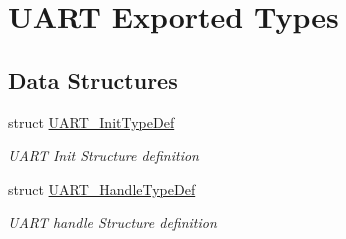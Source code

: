 \hypertarget{group___u_a_r_t___exported___types}{}\section{U\+A\+RT Exported Types}
\label{group___u_a_r_t___exported___types}
\subsection*{Data Structures}
\begin{DoxyCompactItemize}
\item 
struct \mbox{\hyperlink{struct_u_a_r_t___init_type_def}{U\+A\+R\+T\+\_\+\+Init\+Type\+Def}}
\begin{DoxyCompactList}\small\item\em U\+A\+RT Init Structure definition ~\newline
 \end{DoxyCompactList}\item 
struct \mbox{\hyperlink{struct_u_a_r_t___handle_type_def}{U\+A\+R\+T\+\_\+\+Handle\+Type\+Def}}
\begin{DoxyCompactList}\small\item\em U\+A\+RT handle Structure definition ~\newline
 \end{DoxyCompactList}\end{DoxyCompactItemize}
